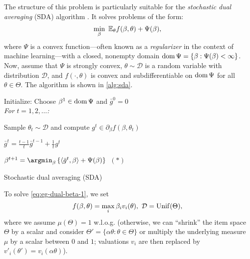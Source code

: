 The structure of this problem is particularly suitable for the \textit{stochastic dual averaging} (SDA) algorithm \citep{xiao2010dual,nesterov2009primal}. 
It solves problems of the form:
\begin{align}
	\min_{\beta} \ \mathbb{E}_\theta f(\beta, \theta) + \Psi(\beta), \label{eq:sda-reg-std-form}
\end{align}
where $\Psi$ is a convex function---often known as a \emph{regularizer} in the context of machine learning---with a closed, nonempty domain ${\rm dom}\, \Psi = \{ \beta: \Psi(\beta) < \infty \}$.
Now, assume that $\Psi$ is strongly convex, $\theta \sim \mathcal{D}$ is a random variable with distribution $\mathcal{D}$, and $f(\cdot, \theta)$ is convex and subdifferentiable on ${\rm dom}\,\Psi$ for all $\theta\in\Theta$. 
The algorithm is shown in \cref{alg:sda}.
\begin{algorithm}
	Initialize: Choose $\beta^1 \in {\rm dom}\, \Psi$ and $\bar{g}^0 = 0$\\
	\noindent\it{For} $t=1,2, \dots$:
	
		\hspace{10pt} Sample $\theta_t \sim \mathcal{D}$ and compute $g^t \in \partial_\beta f(\beta, \theta_t)$
		
		\hspace{10pt} $\bar{g}^t = \frac{t-1}{t}\bar{g}^{t-1} + \frac{1}{t}g^t$
		
		\hspace{10pt} $\beta^{t+1} = \argmin_\beta \left\{ \langle \bar{g}^t, \beta \rangle + \Psi(\beta) \right\}$ $\ (*)$
	\caption{Stochastic dual averaging (SDA)}\label{alg:sda}
\end{algorithm}

To solve \eqref{eq:eg-dual-beta-1}, we set 
\[ f(\beta, \theta) = \max_i \beta_i v_i(\theta),\ \mathcal{D} = {\rm Unif}(\Theta),\] 
where we assume $\mu(\Theta)=1$ w.l.o.g. (otherwise, we can ``shrink'' the item space $\Theta$ by a scalar and consider $\Theta' = \{\alpha\theta: \theta\in \Theta\}$ or multiply the underlying measure $\mu$ by a scalar between $0$ and $1$; valuations $v_i$ are then replaced by $v'_i(\theta') = v_i(\alpha\theta)$).

